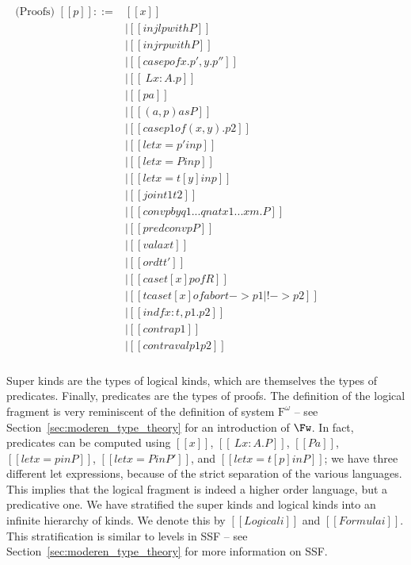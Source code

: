 \begin{center}
\begin{math}
\begin{array}{llllllllllllllll}
\begin{array}{lll}
        \text{(Proofs) } [[p]] ::= 
        & [[x]] \\
        & \mid [[injl p with P]] \\
        & \mid [[injr p with P]] \\
        & \mid [[case p of x . p' , y . p'']] \\
        & \mid [[\ L x : A . p]] \\
        & \mid [[p a]] \\ 
        & \mid [[(a , p ) as P]] \\
        & \mid [[case p1 of ( x , y ) . p2]] \\
        & \mid [[let x = p' in p]] \\
        & \mid [[let x = P in p]] \\
        & \mid [[let x = t [ y ] in p]] \\
        & \mid [[join t1 t2]] \\
        & \mid [[conv p by q1 ... qn at x1 ... xm . P]] \\
        & \mid [[predconv p P]] \\
        & \mid [[valax t]] \\
        & \mid [[ord t t']] \\
        & \mid [[case t [ x ] p of R]] \\
        & \mid [[tcase t [ x ] of abort -> p1 | ! -> p2]] \\
        & \mid [[ind f x : t , p1 . p2]] \\
        & \mid [[contra p1]] \\
        & \mid [[contraval p1 p2]]\\
      \end{array}
    \end{array}
  \end{math}
\end{center}
Super kinds are the types of logical kinds, which are themselves the
types of predicates.  Finally, predicates are the types of proofs.
The definition of the logical fragment is very reminiscent of the
definition of system $\text{F}^\omega$ -- see
Section~\ref{sec:moderen_type_theory} for an introduction of $\Fw$.
In fact, predicates can be computed using $[[x]]$, $[[\ L x : A
. P]]$, $[[P a]]$, $[[let x = p in P]]$, $[[let x = P in P']]$, and
$[[let x = t [ p ] in P]]$; we have three different let expressions,
because of the strict separation of the various languages.  This
implies that the logical fragment is indeed a higher order language,
but a predicative one.  We have stratified the super kinds and logical
kinds into an infinite hierarchy of kinds.  We denote this by
$[[Logical i]]$ and $[[Formula i]]$.  This stratification is similar
to levels in SSF -- see Section~\ref{sec:moderen_type_theory} for more
information on SSF.  

